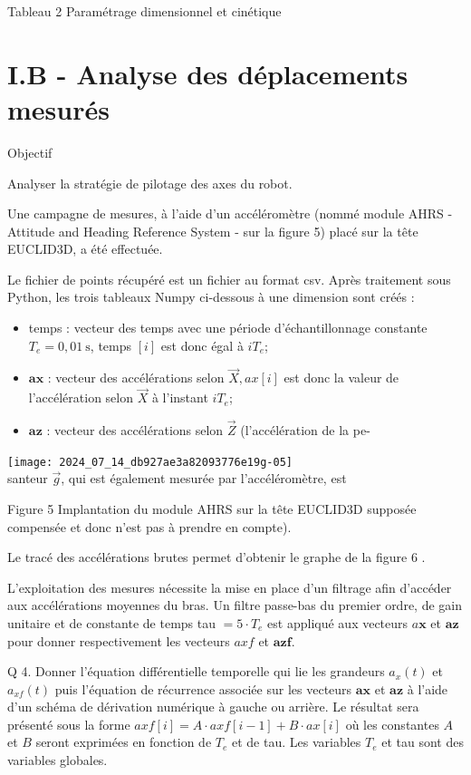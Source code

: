 \documentclass[10pt]{article}
\begin{document}
Tableau 2 Paramétrage dimensionnel et cinétique

\section*{I.B - Analyse des déplacements mesurés}
Objectif

Analyser la stratégie de pilotage des axes du robot.

Une campagne de mesures, à l'aide d'un accéléromètre (nommé module AHRS - Attitude and Heading Reference System - sur la figure 5) placé sur la tête EUCLID3D, a été effectuée.

Le fichier de points récupéré est un fichier au format csv. Après traitement sous Python, les trois tableaux Numpy ci-dessous à une dimension sont créés :

\begin{itemize}
  \item temps : vecteur des temps avec une période d'échantillonnage constante $T_{e}=0,01 \mathrm{~s}$, temps $[i]$ est donc égal à $i T_{e}$;

  \item $\boldsymbol{a x}$ : vecteur des accélérations selon $\vec{X}, a x[i]$ est donc la valeur de l'accélération selon $\vec{X}$ à l'instant $i T_{e}$;

  \item $\boldsymbol{a} \boldsymbol{z}$ : vecteur des accélérations selon $\vec{Z}$ (l'accélération de la pe-

\end{itemize}

\texttt{[image: 2024\_07\_14\_db927ae3a82093776e19g-05]}\\
santeur $\vec{g}$, qui est également mesurée par l'accéléromètre, est

Figure 5 Implantation du module AHRS sur la tête EUCLID3D supposée compensée et donc n'est pas à prendre en compte).

Le tracé des accélérations brutes permet d'obtenir le graphe de la figure 6 .

L'exploitation des mesures nécessite la mise en place d'un filtrage afin d'accéder aux accélérations moyennes du bras. Un filtre passe-bas du premier ordre, de gain unitaire et de constante de temps tau $=5 \cdot T_{e}$ est appliqué aux vecteurs $a \boldsymbol{x}$ et $\boldsymbol{a} \boldsymbol{z}$ pour donner respectivement les vecteurs $a x f$ et $\boldsymbol{a} \boldsymbol{z f}$.

Q 4. Donner l'équation différentielle temporelle qui lie les grandeurs $a_{x}(t)$ et $a_{x f}(t)$ puis l'équation de récurrence associée sur les vecteurs $\boldsymbol{a x}$ et $\boldsymbol{a} \boldsymbol{z}$ à l'aide d'un schéma de dérivation numérique à gauche ou arrière. Le résultat sera présenté sous la forme $a x f[i]=A \cdot a x f[i-1]+B \cdot a x[i]$ où les constantes $A$ et $B$ seront exprimées en fonction de $T_{e}$ et de tau. Les variables $T_{e}$ et tau sont des variables globales.
\end{document}
